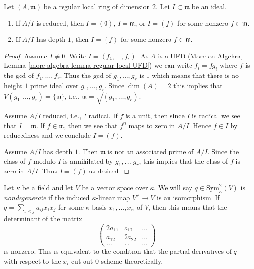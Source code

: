 \begin{lemma}
\label{lemma-reduced-quotient-regular-ring-dim-2}
Let $(A, \mathfrak m)$ be a regular local ring of dimension $2$.
Let $I \subset \mathfrak m$ be an ideal.
\begin{enumerate}
\item If $A/I$ is reduced, then $I = (0)$, $I = \mathfrak m$, or
$I = (f)$ for some nonzero $f \in \mathfrak m$.
\item If $A/I$ has depth $1$, then $I = (f)$ for some nonzero
$f \in \mathfrak m$. 
\end{enumerate}
\end{lemma}

\begin{proof}
Assume $I \not = 0$. Write $I = (f_1, \ldots, f_r)$. As $A$ is a UFD
(More on Algebra, Lemma \ref{more-algebra-lemma-regular-local-UFD})
we can write $f_i = fg_i$ where $f$ is the gcd of $f_1, \ldots, f_r$.
Thus the gcd of $g_1, \ldots, g_r$ is $1$ which means that
there is no height $1$ prime ideal over $g_1, \ldots, g_r$.
Since $\dim(A) = 2$ this implies that
$V(g_1, \ldots, g_r) = \{\mathfrak m\}$, i.e.,
$\mathfrak m = \sqrt{(g_1, \ldots, g_r)}$.

\medskip\noindent
Assume $A/I$ reduced, i.e., $I$ radical. If $f$ is a unit, then since $I$
is radical we see that $I = \mathfrak m$. If $f \in \mathfrak m$, then we
see that $f^n$ maps to zero in $A/I$. Hence $f \in I$ by reducedness and
we conclude $I = (f)$.

\medskip\noindent
Assume $A/I$ has depth $1$. Then $\mathfrak m$ is not an associated
prime of $A/I$. Since the class of $f$ modulo $I$ is annihilated
by $g_1, \ldots, g_r$, this implies that the class of $f$ is zero
in $A/I$. Thus $I = (f)$ as desired.
\end{proof}

\noindent
Let $\kappa$ be a field and let $V$ be a vector space over $\kappa$.
We will say $q \in \text{Sym}^2_\kappa(V)$ is {\it nondegenerate}
if the induced $\kappa$-linear map $V^\vee \to V$ is an
isomorphism. If $q = \sum_{i \leq j} a_{ij} x_i x_j$ for some
$\kappa$-basis $x_1, \ldots, x_n$ of $V$, then this means that
the determinant of the matrix
$$
\left(
\begin{matrix}
2a_{11} & a_{12} & \ldots \\
a_{12} & 2a_{22} & \ldots \\
\ldots & \ldots & \ldots
\end{matrix}
\right)
$$
is nonzero. This is equivalent to the condition that the
partial derivatives of $q$ with respect to the $x_i$ cut out
$0$ scheme theoretically.


